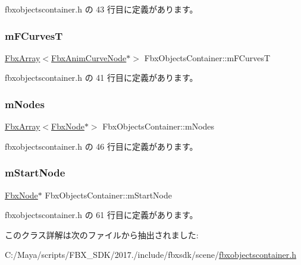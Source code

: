  fbxobjectscontainer.\+h の 43 行目に定義があります。

\mbox{\label{class_fbx_objects_container_afc9a94566abf02db4959f4d2e4ec30a4}} 
\subsubsection{\texorpdfstring{m\+F\+CurvesT}{mFCurvesT}}
{\footnotesize\ttfamily \hyperlink{class_fbx_array}{Fbx\+Array}$<$\hyperlink{class_fbx_anim_curve_node}{Fbx\+Anim\+Curve\+Node}$\ast$$>$ Fbx\+Objects\+Container\+::m\+F\+CurvesT}



 fbxobjectscontainer.\+h の 41 行目に定義があります。

\mbox{\label{class_fbx_objects_container_a8d0ede6ba6ec874eb841593af719f063}} 
\subsubsection{\texorpdfstring{m\+Nodes}{mNodes}}
{\footnotesize\ttfamily \hyperlink{class_fbx_array}{Fbx\+Array}$<$\hyperlink{class_fbx_node}{Fbx\+Node}$\ast$$>$ Fbx\+Objects\+Container\+::m\+Nodes}



 fbxobjectscontainer.\+h の 46 行目に定義があります。

\mbox{\label{class_fbx_objects_container_a650407ad105a3029d29ac5b68e94b062}} 
\subsubsection{\texorpdfstring{m\+Start\+Node}{mStartNode}}
{\footnotesize\ttfamily \hyperlink{class_fbx_node}{Fbx\+Node}$\ast$ Fbx\+Objects\+Container\+::m\+Start\+Node\hspace{0.3cm}{\ttfamily [protected]}}



 fbxobjectscontainer.\+h の 61 行目に定義があります。



このクラス詳解は次のファイルから抽出されました\+:\begin{DoxyCompactItemize}
\item 
C\+:/\+Maya/scripts/\+F\+B\+X\+\_\+\+S\+D\+K/2017./include/fbxsdk/scene/\hyperlink{fbxobjectscontainer_8h}{fbxobjectscontainer.\+h}\end{DoxyCompactItemize}
